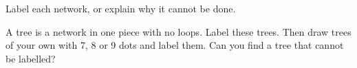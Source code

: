 \documentclass[12pt]{article}
\begin{document}
\vspace{0.4cm}
\begin{center}

\vspace{1.2cm}

\vspace{1.3cm}

\vspace{1.3cm}

\vspace{0.8cm}

\vspace{0.8cm}
\end{center}

\newpage
{} Label each network, or explain why it cannot be done.

\vspace{0.3cm}
{\centering
{}

\vspace{0.6cm}

}

\newpage
{} A tree is a network in one piece with no loops. Label these trees. Then draw trees of your own with 7, 8 or 9 dots and label them. Can you find a tree that cannot be labelled?

\vspace{0.7cm}

\vspace{0.9cm}
\hfill{}
\end{document}
